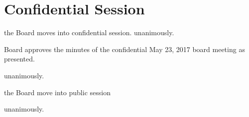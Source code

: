 \section*{Confidential Session}

\begin{motion}
    \birt the Board moves into confidential session. 
    \movers{\brian}{\abdullah}
    \carries unanimously.
\end{motion}

\begin{motion}
    \birt Board approves the minutes of the confidential May 23, 2017 board
    meeting as presented.
    \movers{\aj}{\jill}
    
    \carries unanimously.
\end{motion}

\begin{motion}
    \birt the Board move into public session
    \movers{\brian}{\abdullah}

    \carries unanimously. 
\end{motion}
